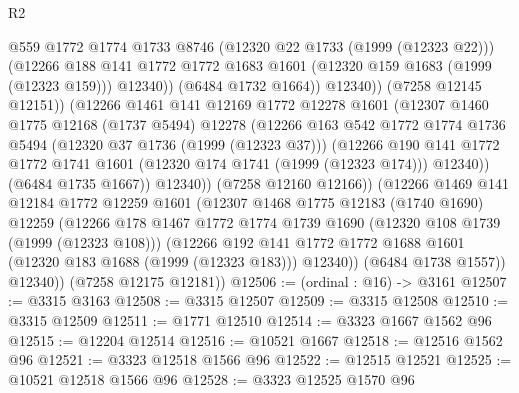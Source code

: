 \begin{lexlean}{R2}
\begin{coremodule}
                      @559
                      @1772
                      @1774
                      @1733
                      @8746
                      (@12320 @22 @1733 (@1999 (@12323 @22)))
                      (@12266
                        @188
                        @141
                        @1772
                        @1772
                        @1683
                        @1601
                        (@12320 @159 @1683 (@1999 (@12323 @159)))
                        @12340))
                    (@6484 @1732 @1664))
                  @12340))
              (@7258 @12145 @12151))
            (@12266
              @1461
              @141
              @12169
              @1772
              @12278
              @1601
              (@12307
                @1460
                @1775
                @12168
                (@1737 @5494)
                @12278
                (@12266
                  @163
                  @542
                  @1772
                  @1774
                  @1736
                  @5494
                  (@12320 @37 @1736 (@1999 (@12323 @37)))
                  (@12266
                    @190
                    @141
                    @1772
                    @1772
                    @1741
                    @1601
                    (@12320 @174 @1741 (@1999 (@12323 @174)))
                    @12340))
                (@6484 @1735 @1667))
              @12340))
          (@7258 @12160 @12166))
        (@12266
          @1469
          @141
          @12184
          @1772
          @12259
          @1601
          (@12307
            @1468
            @1775
            @12183
            (@1740 @1690)
            @12259
            (@12266
              @178
              @1467
              @1772
              @1774
              @1739
              @1690
              (@12320 @108 @1739 (@1999 (@12323 @108)))
              (@12266
                @192
                @141
                @1772
                @1772
                @1688
                @1601
                (@12320 @183 @1688 (@1999 (@12323 @183)))
                @12340))
            (@6484 @1738 @1557))
          @12340))
      (@7258 @12175 @12181))
@12506 := (ordinal : @16) -> @3161
@12507 := @3315 @3163
@12508 := @3315 @12507
@12509 := @3315 @12508
@12510 := @3315 @12509
@12511 := @1771 @12510
@12514 := @3323 @1667 @1562 @96
@12515 := @12204 @12514
@12516 := @10521 @1667
@12518 := @12516 @1562 @96
@12521 := @3323 @12518 @1566 @96
@12522 := @12515 @12521
@12525 := @10521 @12518 @1566 @96
@12528 := @3323 @12525 @1570 @96

\end{coremodule}
\end{lexlean}
